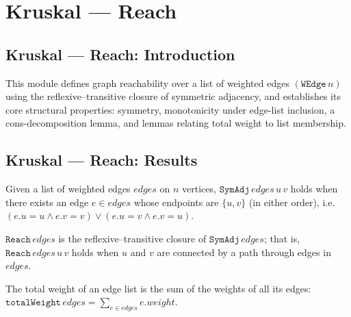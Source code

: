 \section{Kruskal --- Reach}
\subsection*{Kruskal --- Reach: Introduction}

This module defines graph reachability over a list of weighted edges $(\mathtt{WEdge}\,n)$
using the reflexive--transitive closure of symmetric adjacency, and establishes its
core structural properties: symmetry, monotonicity under edge-list inclusion, a
cons-decomposition lemma, and lemmas relating total weight to list membership.

\subsection*{Kruskal --- Reach: Results}

\begin{definition}
\label{Kruskal.SymAdj}
\leanok
{}
Given a list of weighted edges $\mathit{edges}$ on $n$ vertices, $\mathtt{SymAdj}\,\mathit{edges}\,u\,v$
holds when there exists an edge $e \in \mathit{edges}$ whose endpoints are $\{u, v\}$
(in either order), i.e.\ $(e.u = u \wedge e.v = v) \vee (e.u = v \wedge e.v = u)$.
\end{definition}

\begin{definition}[Reachability]
\label{Kruskal.Reach}
\leanok
{}
$\mathtt{Reach}\,\mathit{edges}$ is the reflexive--transitive closure of
$\mathtt{SymAdj}\,\mathit{edges}$; that is, $\mathtt{Reach}\,\mathit{edges}\,u\,v$
holds when $u$ and $v$ are connected by a path through edges in $\mathit{edges}$.
\end{definition}

\begin{definition}
\label{Kruskal.totalWeight}
\leanok
{}
The total weight of an edge list is the sum of the weights of all its edges:
$\mathtt{totalWeight}\,\mathit{edges} = \sum_{e \in \mathit{edges}} e.\mathit{weight}$.
\end{definition}


